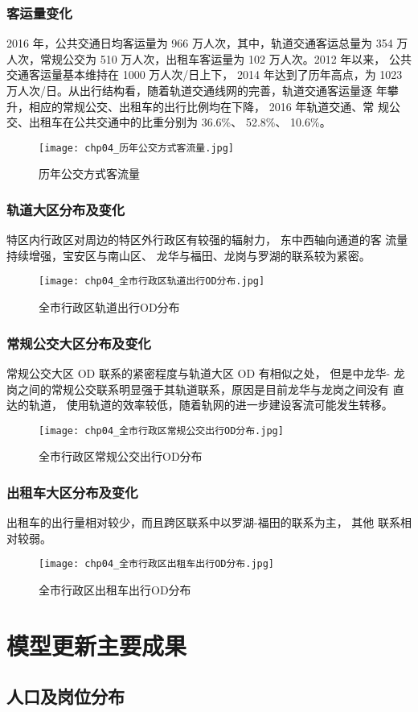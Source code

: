 \subsubsection{客运量变化}
2016 年，公共交通日均客运量为 966 万人次，其中，轨道交通客运总量为
354 万人次，常规公交为 510 万人次，出租车客运量为 102 万人次。2012 年以来，
公共交通客运量基本维持在 1000 万人次/日上下， 2014 年达到了历年高点，为
1023 万人次/日。从出行结构看，随着轨道交通线网的完善，轨道交通客运量逐
年攀升，相应的常规公交、出租车的出行比例均在下降， 2016 年轨道交通、常
规公交、出租车在公共交通中的比重分别为 36.6\%、 52.8\%、 10.6\%。

\begin{figure}[!ht]
  \centering
  \texttt{[image: chp04\_历年公交方式客流量.jpg]}
  \caption{历年公交方式客流量\label{fig:chp04_历年公交方式客流量} }
\end{figure}

\subsubsection{轨道大区分布及变化}
特区内行政区对周边的特区外行政区有较强的辐射力， 东中西轴向通道的客
流量持续增强，宝安区与南山区、 龙华与福田、龙岗与罗湖的联系较为紧密。

\begin{figure}[!ht]
  \centering
  \texttt{[image: chp04\_全市行政区轨道出行OD分布.jpg]}
  \caption{全市行政区轨道出行OD分布\label{fig:chp04_全市行政区轨道出行OD分布} }
\end{figure}

\subsubsection{常规公交大区分布及变化}
常规公交大区 OD 联系的紧密程度与轨道大区 OD 有相似之处， 但是中龙华-
龙岗之间的常规公交联系明显强于其轨道联系，原因是目前龙华与龙岗之间没有
直达的轨道， 使用轨道的效率较低，随着轨网的进一步建设客流可能发生转移。

\begin{figure}[!ht]
  \centering
  \texttt{[image: chp04\_全市行政区常规公交出行OD分布.jpg]}
  \caption{全市行政区常规公交出行OD分布\label{fig:chp04_全市行政区常规公交出行OD分布} }
\end{figure}

\subsubsection{出租车大区分布及变化}
出租车的出行量相对较少，而且跨区联系中以罗湖-福田的联系为主， 其他
联系相对较弱。

\begin{figure}[!ht]
  \centering
  \texttt{[image: chp04\_全市行政区出租车出行OD分布.jpg]}
  \caption{全市行政区出租车出行OD分布\label{fig:chp04_全市行政区出租车出行OD分布} }
\end{figure}

\section{模型更新主要成果}
\subsection{人口及岗位分布}










